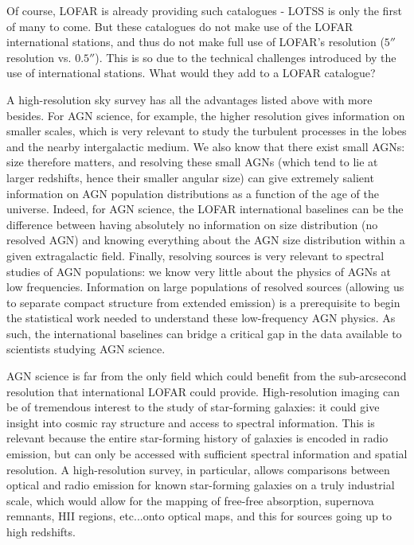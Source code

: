 \pg
Of course, LOFAR is already providing such catalogues - LOTSS   is only the first of many to come. But these catalogues do not make use of the LOFAR international stations, and thus do not make full use of LOFAR's resolution ($5''$ resolution vs. $0.5''$).  This is so due to the technical challenges introduced by the use of international stations. What would they add to a LOFAR catalogue?

\pg
A high-resolution sky survey has all the advantages listed above with more besides. For AGN science, for example, the higher resolution gives information on smaller scales, which is very relevant to study the turbulent processes in the lobes and the nearby intergalactic medium. We also know that there exist small AGNs: size therefore matters, and resolving these small AGNs (which tend to lie at larger redshifts, hence their smaller angular size) can give extremely salient information on AGN population distributions as a function of the age of the universe. Indeed, for AGN science, the LOFAR international baselines can be the difference between having absolutely no information on size distribution (no resolved AGN) and knowing everything about the AGN size distribution within a given extragalactic field. Finally, resolving sources is very relevant to spectral studies of AGN populations: we know very little about the physics of AGNs at low frequencies. Information on large populations of resolved sources (allowing us to separate compact structure from extended emission) is a prerequisite to begin the statistical work needed to understand these low-frequency AGN physics. As such, the international baselines can bridge a critical gap in the data available to scientists studying AGN science.

\pg
AGN science is far from the only field which could benefit from the sub-arcsecond resolution that international LOFAR could provide. High-resolution imaging can be of tremendous interest to the study of star-forming galaxies: it could give insight into cosmic ray structure and access to spectral information. This is relevant because the entire star-forming history of galaxies is encoded in radio emission, but can only be accessed with sufficient spectral information and spatial resolution. A high-resolution survey, in particular, allows comparisons between optical and radio emission for known star-forming galaxies on a truly industrial scale, which would allow for the mapping of free-free absorption, supernova remnants, HII regions, etc...onto optical maps, and this for sources going up to high redshifts.

